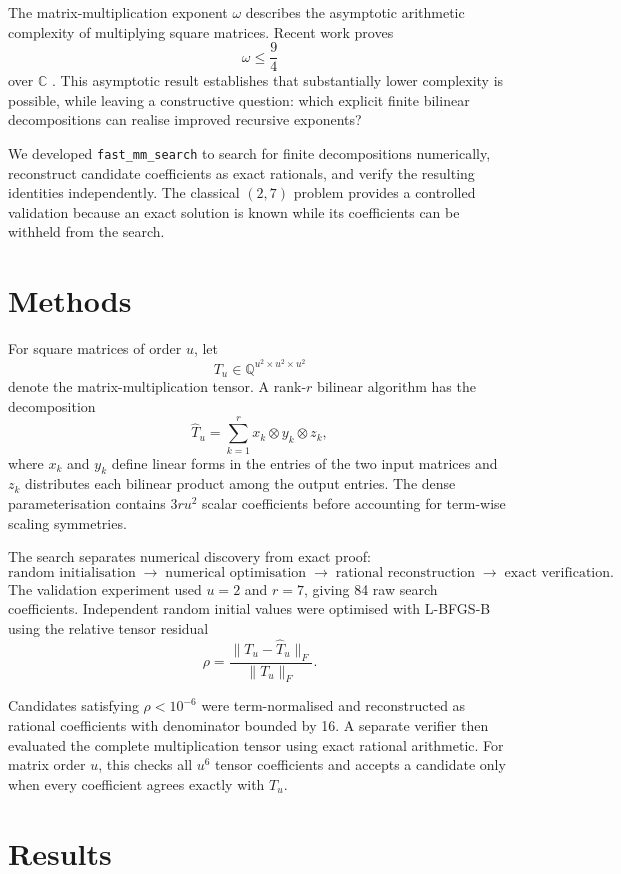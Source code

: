 \documentclass[12pt]{article}
\begin{document}
The matrix-multiplication exponent $\omega$ describes the asymptotic
arithmetic complexity of multiplying square matrices. Recent work
proves
\[
\omega \leq \frac{9}{4}
\]
over $\mathbb{C}$ \cite{openai2026}. This asymptotic result establishes
that substantially lower complexity is possible, while leaving a
constructive question: which explicit finite bilinear decompositions
can realise improved recursive exponents?

We developed \texttt{fast\_mm\_search} to search for finite
decompositions numerically, reconstruct candidate coefficients as
exact rationals, and verify the resulting identities independently.
The classical $(2,7)$ problem provides a controlled validation because
an exact solution is known while its coefficients can be withheld
from the search.

\section{Methods}

For square matrices of order $u$, let
\[
T_u \in \mathbb{Q}^{u^2\times u^2\times u^2}
\]
denote the matrix-multiplication tensor. A rank-$r$ bilinear algorithm
has the decomposition
\[
\widehat{T}_u
=
\sum_{k=1}^{r}
x_k \otimes y_k \otimes z_k,
\]
where $x_k$ and $y_k$ define linear forms in the entries of the two
input matrices and $z_k$ distributes each bilinear product among the
output entries. The dense parameterisation contains $3ru^2$ scalar
coefficients before accounting for term-wise scaling symmetries.

The search separates numerical discovery from exact proof:
\[
\text{random initialisation}
\;\longrightarrow\;
\text{numerical optimisation}
\;\longrightarrow\;
\text{rational reconstruction}
\;\longrightarrow\;
\text{exact verification}.
\]
The validation experiment used $u=2$ and $r=7$, giving 84 raw search
coefficients. Independent random initial values were optimised with
L-BFGS-B using the relative tensor residual
\[
\rho
=
\frac{\lVert T_u-\widehat{T}_u\rVert_F}
     {\lVert T_u\rVert_F}.
\]

Candidates satisfying $\rho<10^{-6}$ were term-normalised and
reconstructed as rational coefficients with denominator bounded by
16. A separate verifier then evaluated the complete multiplication
tensor using exact rational arithmetic. For matrix order $u$, this
checks all $u^6$ tensor coefficients and accepts a candidate only when
every coefficient agrees exactly with $T_u$.

\section{Results}
\end{document}

